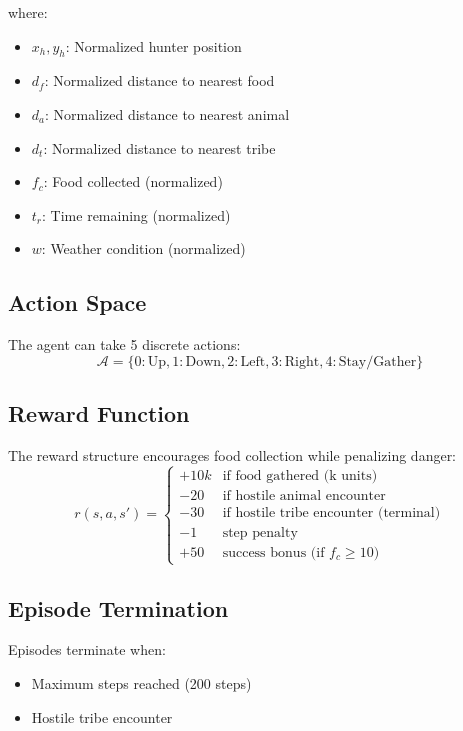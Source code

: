 \documentclass[12pt,a4paper]{article}
\begin{document}
where:
\begin{itemize}
    \item $x_h, y_h$: Normalized hunter position
    \item $d_f$: Normalized distance to nearest food
    \item $d_a$: Normalized distance to nearest animal
    \item $d_t$: Normalized distance to nearest tribe
    \item $f_c$: Food collected (normalized)
    \item $t_r$: Time remaining (normalized)
    \item $w$: Weather condition (normalized)
\end{itemize}

\subsection{Action Space}
The agent can take 5 discrete actions:
\begin{equation}
\mathcal{A} = \{0: \text{Up}, 1: \text{Down}, 2: \text{Left}, 3: \text{Right}, 4: \text{Stay/Gather}\}
\end{equation}

\subsection{Reward Function}
The reward structure encourages food collection while penalizing danger:
\begin{equation}
r(s,a,s') = \begin{cases}
+10k & \text{if food gathered (k units)} \\
-20 & \text{if hostile animal encounter} \\
-30 & \text{if hostile tribe encounter (terminal)} \\
-1 & \text{step penalty} \\
+50 & \text{success bonus (if } f_c \geq 10 \text{)}
\end{cases}
\end{equation}

\subsection{Episode Termination}
Episodes terminate when:
\begin{itemize}
    \item Maximum steps reached (200 steps)
    \item Hostile tribe encounter
\end{itemize}
\end{document}
